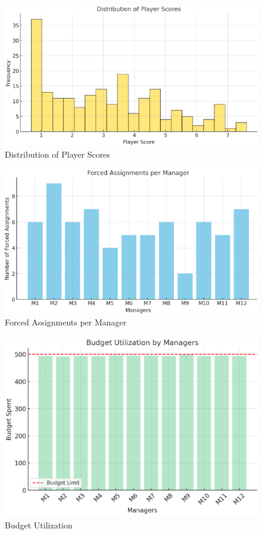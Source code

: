 \documentclass[sigconf]{acmart}
\begin{document}
	\begin{figure}[H]
		\centering
		\includegraphics[width=0.9\linewidth]{plot/player_score_distribution.png}
		\caption{Distribution of Player Scores}
		\label{fig:player_score_dist}
	\end{figure}
	
	\begin{figure}[H]
		\centering
		\includegraphics[width=0.9\linewidth]{plot/forced_assignments.png}
		\caption{Forced Assignments per Manager}
		\label{fig:forced_assignments}
	\end{figure}
	
	\begin{figure}[H]
		\centering
		\includegraphics[width=0.9\linewidth]{plot/budget_usage.png}
		\caption{Budget Utilization}
		\label{fig:budget_usage}
	\end{figure}
	
\end{document}
